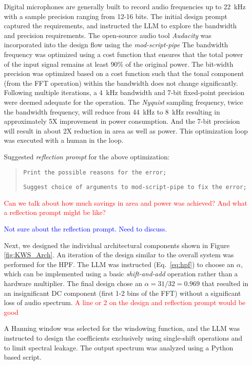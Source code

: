 Digital microphones are generally built to record audio frequencies up to 22~kHz with a sample precision ranging from 12-16 bits. The initial design prompt captured the requirements, and instructed the LLM to explore the bandwidth and precision requirements. The open-source audio tool \textit{Audacity} was incorporated into the design flow using the \textit{ mod-script-pipe} The bandwidth frequency was optimized using a cost function that ensures that the total power of the input signal remains at least 90\% of the original power. The bit-width precision was optimized based on a cost function such that the tonal component (from the FFT operation) within the bandwidth does not change significantly.
 Following multiple iterations, a 4~kHz bandwidth and 7-bit fixed-point precision were deemed adequate for the operation. The \textit{Nyquist} sampling frequency, twice the bandwidth frequency, will reduce from 44~kHz to 8~kHz resulting in approximately 5X improvement in power consumption. And the 7-bit precision will result in about 2X reduction in area as well as power. 
This optimization loop was executed with a human in the loop.

Suggested \textit{reflection prompt} for the above optimization:
\begin{quote}
\texttt{Print the possible reasons for the error;}

\texttt{Suggest choice of arguments to mod-script-pipe to fix the error;}
\end{quote}

\textcolor{red}{Can we talk about how much savings in area and power was achieved? And what a reflection prompt might be like?}

\textcolor{blue}{Not sure about the reflection prompt. Need to discuss.}

Next, we designed the individual architectural components shown in Figure \ref{fig:KWS_Arch}. An iteration of the design similar to the overall system was performed for the HPF. The LLM was instructed (Eq.~\ref{eq:hpf}) to choose an $\alpha$, which can be implemented using a basic \textit{shift-and-add} operation rather than a hardware multiplier. The final design chose an $\alpha = 31/32 = 0.969$ that resulted in an insignificant DC component (first 1-2 bins of the FFT) without a significant loss of audio spectrum.  \textcolor{red}{A line or 2 on the design and reflection prompt would be good}

A Hanning window was selected for the windowing function, and the LLM was instructed to design the coefficients exclusively using single-shift operations and to limit spectral leakage. The output spectrum was analyzed using a Python based script. 

